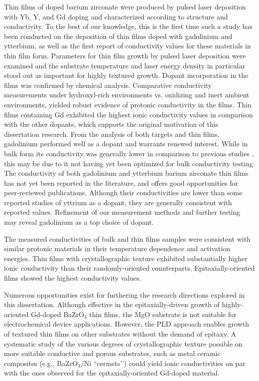 Thin films of doped barium zirconate were produced by pulsed laser deposition with Yb, Y, and Gd doping and characterized according to structure and conductivity. To the best of our knowledge, this is the first time such a study has been conducted on the deposition of thin films doped with gadolinium and ytterbium, as well as the first report of conductivity values for these materials in thin film form. Parameters for thin film growth by pulsed laser deposition were examined and the substrate temperature and laser energy density in particular stood out as important for highly textured growth. Dopant incorporation in the films was confirmed by chemical analysis. Comparative conductivity measurements under hydroxyl-rich environments vs. oxidizing and inert ambient environments, yielded robust evidence of protonic conductivity in the films. Thin films containing Gd exhibited the highest ionic conductivity values in comparison with the other dopants, which supports the original motivation of this dissertation research. From the analysis of both targets and thin films, gadolinium performed well as a dopant and warrants renewed interest. While in bulk form its conductivity was generally lower in comparison to previous studies \cite{Gilardi2017}, this may be due to it not having yet been optimized for bulk conductivity testing. The conductivity of both gadolinium and ytterbium barium zirconate thin films has not yet been reported in the literature, and offers good opportunities for peer-reviewed publications. Although their conductivities are lower than some reported studies of yttrium as a dopant, they are generally consistent with reported values. Refinement of our measurement methods and further testing may reveal gadolinium as a top choice of dopant.

The measured conductivities of bulk and thin films samples were consistent with similar
protonic materials in their temperature dependence and activation energies. Thin films with crystallographic texture exhibited substantially higher ionic conductivity than their randomly-oriented counterparts. Epitaxially-oriented films showed the highest conductivity values.

Numerous opportunities exist for furthering the research directions explored in this dissertation. Although effective in the epitaxially-driven growth of highly-oriented Gd-doped BaZrO$_3$ thin films, the MgO substrate is not suitable for electrochemical device applications. However, the PLD approach enables growth of textured thin films on other substrates without the demand of epitaxy. A systematic study of the various degrees of crystallographic texture possible on more suitable conductive and porous substrates, such as metal ceramic composites (e.g., BaZrO$_3$/Ni ``cermets’’) could yield ionic conductivities on par with the ones observed for the epitaxially-oriented Gd-doped material.

